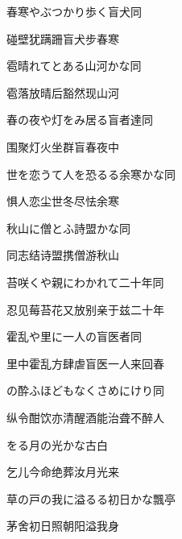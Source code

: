 \begin{haiku}
    {\FH 春寒やぶつかり歩く盲犬}\hfill{\FH 同}

    {\FK 碰壁犹蹒跚盲犬步春寒}
\end{haiku}

\begin{haiku}
    {\FH 雹晴れてとある山河かな}\hfill{\FH 同}

    {\FK 雹落放晴后豁然现山河}
\end{haiku}

\begin{haiku}
    {\FH 春の夜や灯をみ居る盲者達}\hfill{\FH 同}

    {\FK 围聚灯火坐群盲春夜中}
\end{haiku}

\begin{haiku}
    {\FH 世を恋うて人を恐るる余寒かな}\hfill{\FH 同}

    {\FK 惧人恋尘世冬尽怯余寒}
\end{haiku}

\begin{haiku}
    {\FH 秋山に僧とふ詩盟かな}\hfill{\FH 同}

    {\FK 同志结诗盟携僧游秋山}
\end{haiku}

\begin{haiku}
    {\FH 苔咲くや親にわかれて二十年}\hfill{\FH 同}

    {\FK 忍见莓苔花又放别亲于兹二十年}
\end{haiku}

\begin{haiku}
    {\FH 霍乱や里に一人の盲医者}\hfill{\FH 同}

    {\FK 里中霍乱方肆虐盲医一人来回春}
\end{haiku}

\begin{haiku}
    {\FH {}の酔ふほどもなくさめにけり}\hfill{\FH 同}

    {\FK 纵令酣饮亦清醒酒能治聋不醉人}
\end{haiku}

\begin{haiku}
    {\FH {}をる月の光かな}\hfill{\FH 古白}

    {\FK 乞儿今命绝葬汝月光来}
\end{haiku}

\begin{haiku}
    {\FH 草の戸の我に溢るる初日かな}\hfill{\FH 飄亭}

    {\FK 茅舍初日照朝阳溢我身}
\end{haiku}

